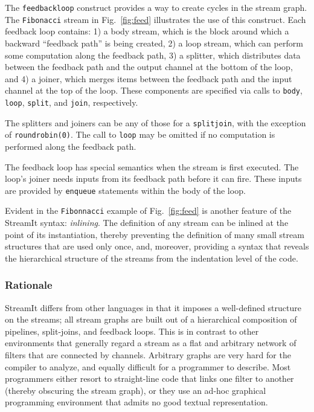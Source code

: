 \documentclass[final]{ijpp}
\begin{document}
The \texttt{feedbackloop} construct provides a way to create cycles in
the    stream    graph.      The    \texttt{Fibonacci}    stream    in
Fig.~\ref{fig:feed}  illustrates the  use of  this  construct.  Each
feedback loop  contains: 1) a body  stream, which is  the block around
which a backward ``feedback path'' is being created, 2) a loop stream,
which  can perform  some computation  along  the feedback  path, 3)  a
splitter,  which distributes data  between the  feedback path  and the
output  channel at  the bottom  of the  loop, and  4) a  joiner, which
merges items  between the feedback path  and the input  channel at the
top  of  the  loop.   These  components are  specified  via  calls  to
\texttt{body},   \texttt{loop},  \texttt{split},   and  \texttt{join},
respectively.

The   splitters   and   joiners   can   be  any   of   those   for   a
\texttt{splitjoin}, with the exception of \texttt{roundrobin(0)}.  The
call to  \texttt{loop} may be  omitted if no computation  is performed
along the feedback path.

The  feedback loop  has special  semantics  when the  stream is  first
executed.   The loop's  joiner  needs inputs  from  its feedback  path
before  it can fire.   These inputs  are provided  by \texttt{enqueue}
statements within the body of the loop.

Evident in the \texttt{Fibonnacci} example of Fig.~\ref{fig:feed} is
another  feature   of  the  StreamIt   syntax:  \emph{inlining}.   The
definition  of  any  stream  can  be  inlined  at  the  point  of  its
instantiation, thereby preventing the  definition of many small stream
structures that are used only  once, and, moreover, providing a syntax
that  reveals  the hierarchical  structure  of  the  streams from  the
indentation level of the code.

\subsubsection{Rationale}
StreamIt  differs   from  other  languages   in  that  it   imposes  a
well-defined structure on the streams; all stream graphs are built out
of a hierarchical composition  of pipelines, split-joins, and feedback
loops.   This is  in  contrast to  other  environments that  generally
regard a  stream as a flat  and arbitrary network of  filters that are
connected  by  channels.   Arbitrary  graphs  are very  hard  for  the
compiler  to  analyze,  and  equally  difficult for  a  programmer  to
describe.  Most  programmers either resort to  straight-line code that
links one filter  to another (thereby obscuring the  stream graph), or
they use  an ad-hoc graphical  programming environment that  admits no
good textual representation.
\end{document}
